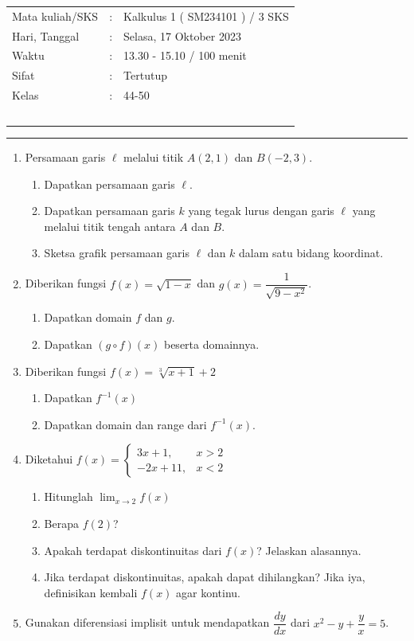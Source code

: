 \documentclass[10pt,openany,a4paper]{article}
\theoremstyle{definition}
\theoremstyle{definition}
\theoremstyle{plain}
\begin{document}
    \begin{center}
	\begin{tabular}{lcl}
		Mata kuliah/SKS & : & Kalkulus 1 ( SM234101 ) / 3 SKS\\
		Hari, Tanggal & : & Selasa, 17 Oktober 2023\\
		Waktu & : & 13.30 - 15.10 / 100 menit\\
		Sifat & : & Tertutup\\
		Kelas & : & 44-50\\
  ~
	\end{tabular}

    \noindent\rule{\textwidth}{2.pt}
        \end{center}
    \begin{enumerate}
    \item Persamaan garis $\ell$ melalui titik $A(2,1)$ dan $B(-2,3)$.
    \begin{enumerate}
        \item Dapatkan persamaan garis $\ell$.
        \item Dapatkan persamaan garis $k$ yang tegak lurus dengan garis $\ell$ yang melalui titik tengah antara $A$ dan $B$.
        \item Sketsa grafik persamaan garis $\ell$ dan $k$ dalam satu bidang koordinat.
    \end{enumerate}

    \item Diberikan fungsi $f(x)=\sqrt{1-x}$ dan $g(x)=\dfrac{1}{\sqrt{9-x^2}}$.
    \begin{enumerate}
        \item Dapatkan domain $f$ dan $g$.
        \item Dapatkan $(g\circ f)(x)$ beserta domainnya.
    \end{enumerate}

    \item Diberikan fungsi $f(x)=\sqrt[3]{x+1}+2$
    \begin{enumerate}
        \item Dapatkan $f^{-1}(x)$
        \item Dapatkan domain dan range dari $f^{-1}(x)$.
    \end{enumerate}

    \item Diketahui $f(x)=\begin{cases}
        3x+1, & x>2\\
        -2x+11, & x<2
    \end{cases}$
    \begin{enumerate}
        \item Hitunglah $\displaystyle\lim_{x\to 2}f(x)$
        \item Berapa $f(2)$?
        \item Apakah terdapat diskontinuitas dari $f(x)$? Jelaskan alasannya.
        \item Jika terdapat diskontinuitas, apakah dapat dihilangkan? Jika iya, definisikan kembali $f(x)$ agar kontinu.
    \end{enumerate}

    \item Gunakan diferensiasi implisit untuk mendapatkan $\dfrac{dy}{dx}$ dari $x^2-y+\dfrac{y}{x}=5$.
\end{enumerate}
\end{document}
